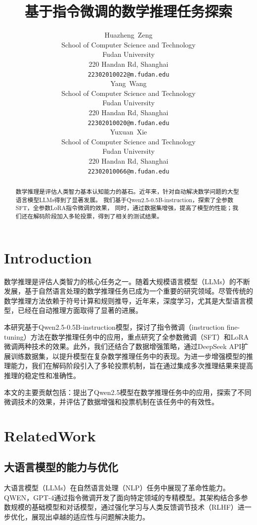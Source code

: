 \documentclass{article}
\title{基于指令微调的数学推理任务探索}
\author{
    Huazheng~Zeng\\
    School of Computer Science and Technology \\
    Fudan University \\
    220 Handan Rd, Shanghai \\
    \texttt{22302010022@m.fudan.edu} \\
    \AND
    Yang~Wang\\
    School of Computer Science and Technology \\
    Fudan University \\
    220 Handan Rd, Shanghai \\
    \texttt{22302010020@m.fudan.edu} \\
    \AND
    Yuxuan~Xie\\
    School of Computer Science and Technology \\
    Fudan University \\
    220 Handan Rd, Shanghai \\
    \texttt{22302010066@m.fudan.edu} \\
}
\begin{document}
\maketitle


\begin{abstract}
  数学推理是评估人类智力基本认知能力的基石。近年来，针对自动解决数学问题的大型语言模型LLMs得到了显著发展。
  我们基于Qwen2.5-0.5B-instruction，探索了全参数SFT，全参数LoRA指令微调的效果，
  同时，通过数据集增强，提高了模型的性能；我们还在解码阶段加入多轮投票，得到了相关的测试结果。
\end{abstract}



\section{Introduction}

数学推理是评估人类智力的核心任务之一。随着大规模语言模型（LLMs）的不断发展，基于自然语言处理的数学推理任务已成为一个重要的研究领域。尽管传统的数学推理方法依赖于符号计算和规则推导，近年来，深度学习，尤其是大型语言模型，已经在自动推理方面取得了显著的进展。

本研究基于Qwen2.5-0.5B-instruction模型，探讨了指令微调（instruction fine-tuning）方法在数学推理任务中的应用，重点研究了全参数微调（SFT）和LoRA微调两种技术的效果。此外，我们还结合了数据增强策略，通过DeepSeek API扩展训练数据集，以提升模型在复杂数学推理任务中的表现。为进一步增强模型的推理能力，我们在解码阶段引入了多轮投票机制，旨在通过集成多次推理结果来提高推理的稳定性和准确性。

本文的主要贡献包括：提出了Qwen2.5模型在数学推理任务中的应用，探索了不同微调技术的效果，并评估了数据增强和投票机制在该任务中的有效性。







\section{RelatedWork}

\subsection{大语言模型的能力与优化}
大语言模型（LLMs）在自然语言处理（NLP）任务中展现了革命性能力。QWEN\cite{bai2023qwentech}，GPT-4通过指令微调开发了面向特定领域的专精模型。其架构结合多参数规模的基础模型和对话模型，通过强化学习与人类反馈调节技术（RLHF）进一步优化，展现出卓越的适应性与问题解决能力\cite{bai2023qwentech}\cite{openai2024gpt4}。
\end{document}
